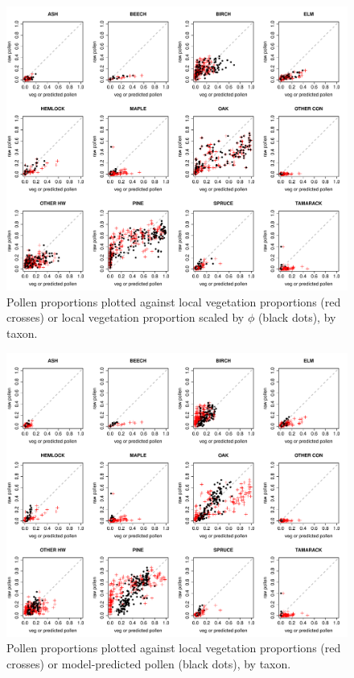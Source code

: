 \begin{figure}
\centering
\includegraphics[width=7in]{figures/pollen_focal_scaled.pdf}
\caption{Pollen proportions plotted against local vegetation proportions (red crosses) or local vegetation proportion scaled by $\phi$ (black dots), by taxon.}
\label{fig:focal_scaled}
\end{figure}

\begin{figure}
\centering
\includegraphics[width=7in]{figures/pollen_preds.pdf}
\caption{Pollen proportions plotted against local vegetation proportions (red crosses) or model-predicted pollen (black dots), by taxon.}
\label{fig:preds}
\end{figure}

